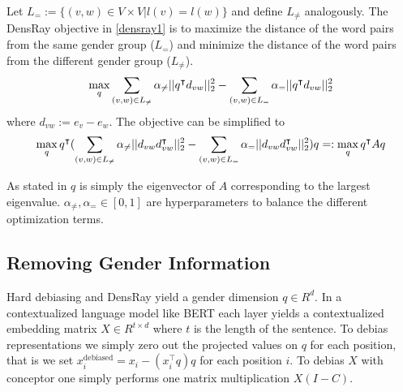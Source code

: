 Let $L_{=}:=\{(v,w)\in V\times V|l(v)=l(w)\}$ and define
$L_{\neq}$ analogously.  The DensRay objective
in \eqref{densray1} is to maximize the distance of the word
pairs from the same gender group ($L_{=}$) and minimize the
distance of the word pairs from the different gender group
($L_{\neq}$).
\begin{eqnarray}
\max\limits_{q} 
\sum_{(v,w)\in L_{\neq}}\alpha_{\neq}||q^\intercal d_{vw}||^2_2
-\sum_{(v,w)\in L_{=}}\alpha_{=}||q^\intercal d_{vw}||^2_2
\eqlabel{densray1}
\end{eqnarray}
where $d_{vw}:=e_v-e_w$. The objective can be simplified to 
\begin{eqnarray}
\max \limits_{q} q^\intercal(
\sum_{(v,w)\in L_{\neq}}\alpha_{\neq}||d_{vw}d_{vw}^\intercal ||^2_2-\sum_{(v,w)\in L_{=}}\alpha_{=}||d_{vw}d_{vw}^\intercal ||^2_2)q=:\max\limits_{q} q^\intercal Aq
\eqlabel{eq:densray2}
\end{eqnarray}

As stated in \cite{dufter2019analytical} $q$ is simply the eigenvector of $A$ corresponding to the largest eigenvalue.
$\alpha_{\neq},\alpha_{=}\in [0,1]$ are hyperparameters to balance the different optimization terms. 



\subsection{Removing Gender Information}

Hard debiasing and DensRay yield a gender dimension $q \in R^d$. In a contextualized language model like BERT each layer yields a contextualized embedding matrix $X \in R^{t \times d}$ where $t$ is the length of the sentence. To debias representations we simply zero out the projected values on $q$ for each position, that is we set $x^{\text{debiased}}_i = x_i -  (x_i^\intercal q) q$ for each position $i$.
To debias $X$ with conceptor one simply performs one matrix multiplication $X(I-C)$. 

